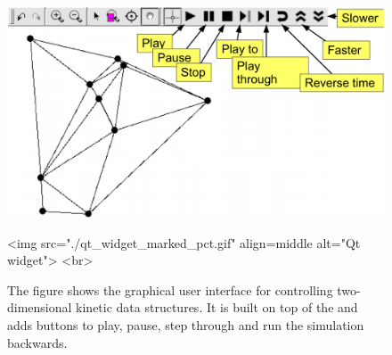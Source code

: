 \begin{figure}
\begin{ccTexOnly}
\begin{center}
\includegraphics[scale=.5]{Kinetic_data_structures/qt_widget_marked_pct}
\end{center}
\end{ccTexOnly}
\begin{ccHtmlOnly}
<img src="./qt_widget_marked_pct.gif" align=middle alt="Qt widget"> <br>
\end{ccHtmlOnly}
\caption{\label{fig:kds_qtwidget_capture} The figure shows the graphical user interface for
  controlling two-dimensional kinetic data structures. It is built on
  top of the  and adds buttons to play, pause, step
  through and run the simulation backwards.}
\end{figure}
